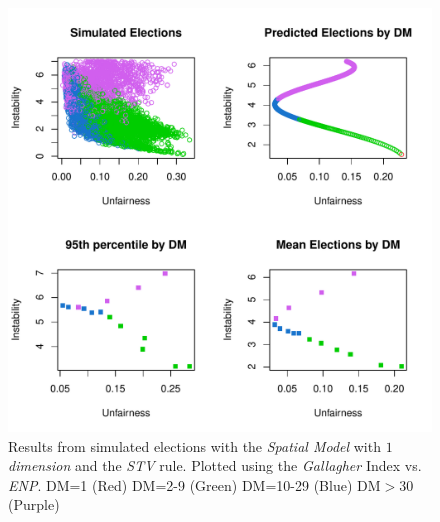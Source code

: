 \documentclass{article}
\begin{document}
\begin{figure}[]
\includegraphics[scale=1.00]{images/stv_spatial1_gallagher_enp.pdf}
\caption{Results from simulated elections with the \emph{Spatial Model} with \emph{$1$ dimension} and the \emph{STV} rule. Plotted using the \emph{Gallagher} Index vs. \emph{ENP}. DM=1 (Red) DM=2-9 (Green) DM=10-29 (Blue) DM$>$30 (Purple)}
\label{fig:stv_spatial1}
\end{figure}
\end{document}
